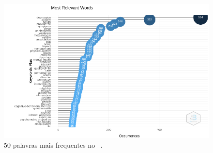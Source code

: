 \begin{figure}[htp]
    \centering
    \includegraphics[angle=0,width=1\textwidth]{experiments/GustavoMacCar/AnaliseBibliometrica/PsychDiseasesTech/mfw.png}
    \caption{50 palavras mais frequentes no \dataset\ .}
    \label{fig:psych:mfw}
\end{figure}